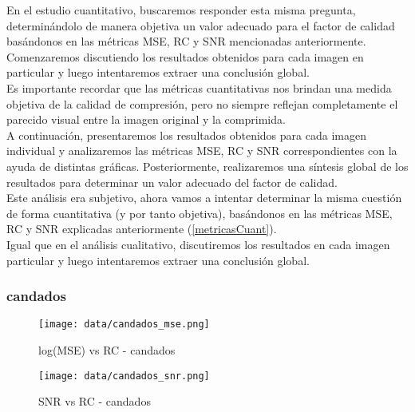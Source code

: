 \documentclass[12pt,a4paper]{article}
\begin{document}
En el estudio cuantitativo, buscaremos responder esta misma pregunta, determinándolo de manera objetiva un valor adecuado para el factor de calidad basándonos en las métricas MSE, RC y SNR mencionadas anteriormente. Comenzaremos discutiendo los resultados obtenidos para cada imagen en particular y luego intentaremos extraer una conclusión global.\\

Es importante recordar que las métricas cuantitativas nos brindan una medida objetiva de la calidad de compresión, pero no siempre reflejan completamente el parecido visual entre la imagen original y la comprimida.\\ 

A continuación, presentaremos los resultados obtenidos para cada imagen individual y analizaremos las métricas MSE, RC y SNR correspondientes con la ayuda de distintas gráficas. Posteriormente, realizaremos una síntesis global de los resultados para determinar un valor adecuado del factor de calidad.\\

Este análisis era subjetivo, ahora vamos a intentar determinar la misma cuestión de forma cuantitativa (y por tanto objetiva), basándonos en las métricas MSE, RC y SNR explicadas anteriormente (\ref{metricasCuant}). \\

Igual que en el análisis cualitativo, discutiremos los resultados en cada imagen particular y luego intentaremos extraer una conclusión global.\\

\subsubsection{candados}
\hspace*{-2.5em}
\begin{minipage}{0.5\textwidth}
        \centering
        \begin{figure}[H]
        \centering
        \texttt{[image: data/candados\_mse.png]}
        \caption{log(MSE) vs RC - candados}
        \label{cand-mse}
        \end{figure}
        \end{minipage}\hfill
        \begin{minipage}{0.5\textwidth}
         \begin{figure}[H]
        \centering
        \texttt{[image: data/candados\_snr.png]}
        \caption{SNR vs RC - candados}
        \label{cand-snr}
        
        \end{figure}  
\end{minipage}
\end{document}
